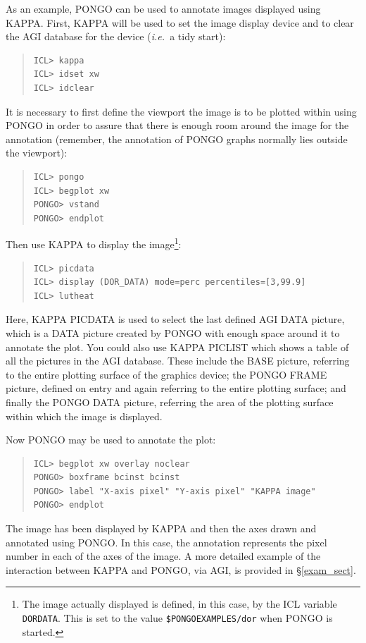 \documentclass[twoside,11pt]{article}
\newcommand{\xref}[3]{#1}
\renewcommand{\_}{\texttt{\symbol{95}}}
\newcommand{\ie}{{\em i.e.\ }}
\begin{document}
As an example, PONGO can be used to annotate images displayed using
\xref{KAPPA}{sun95}{}.  First, KAPPA will be used to set the image
display device and to clear the AGI database for the device (\ie a
tidy start):
\begin{quote}
\begin{verbatim}
ICL> kappa
ICL> idset xw
ICL> idclear
\end{verbatim}
\end{quote}
It is necessary to first define the viewport the image is to be plotted within
using PONGO in order to assure that there is enough room around the image for
the annotation (remember, the annotation of PONGO graphs normally lies outside
the viewport):
\begin{quote}
\begin{verbatim}
ICL> pongo
ICL> begplot xw
PONGO> vstand
PONGO> endplot
\end{verbatim}
\end{quote}
Then use \xref{KAPPA}{sun95}{DISPLAY} to display the
image\footnote{The image actually displayed is defined, in this case,
by the ICL variable \texttt{DOR\_DATA}. This is set to the value
\texttt{\$PONGO\_EXAMPLES/dor} when PONGO is started.}:
\begin{quote}
\begin{verbatim}
ICL> picdata
ICL> display (DOR_DATA) mode=perc percentiles=[3,99.9]
ICL> lutheat
\end{verbatim}
\end{quote}
Here, \xref{KAPPA PICDATA}{sun95}{PICDATA} is used to select the last
defined AGI DATA picture, which is a DATA picture created by PONGO
with enough space around it to annotate the plot. You could also use
\xref{KAPPA PICLIST}{sun95}{PICLIST} which shows a table of all the
pictures in the AGI database.  These include the BASE picture,
referring to the entire plotting surface of the graphics device;
the PONGO FRAME picture, defined on entry and again referring to the
entire plotting surface; and finally the PONGO DATA picture, referring
the area of the plotting surface within which the image is displayed.

Now PONGO may be used to annotate the plot:
\begin{quote}
\begin{verbatim}
ICL> begplot xw overlay noclear
PONGO> boxframe bcinst bcinst
PONGO> label "X-axis pixel" "Y-axis pixel" "KAPPA image"
PONGO> endplot
\end{verbatim}
\end{quote}
The image has been displayed by \xref{KAPPA}{sun95}{} and then the
axes drawn and annotated using PONGO.  In this case, the annotation
represents the pixel number in each of the axes of the image.  A more
detailed example of the interaction between \xref{KAPPA}{sun95}{} and
PONGO, via \xref{AGI}{sun48}{}, is provided in \S\ref{exam_sect}.
\end{document}
